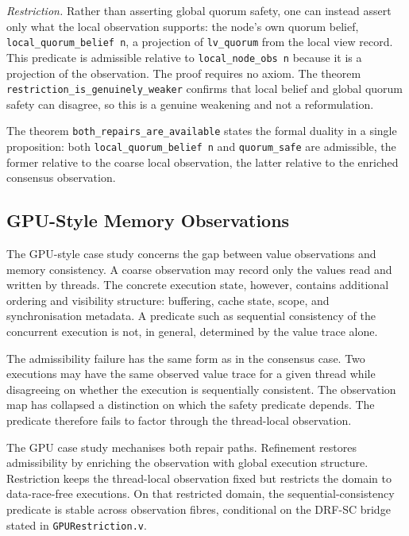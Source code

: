\textit{Restriction.} Rather than asserting global quorum safety, one can
instead assert only what the local observation supports: the node's own quorum
belief, \texttt{local\_quorum\_belief~n}, a projection of \texttt{lv\_quorum}
from the local view record. This predicate is admissible relative to
\texttt{local\_node\_obs~n} because it is a projection of the observation.
The proof requires no axiom. The theorem \texttt{restriction\_is\_genuinely\_weaker}
confirms that local belief and global quorum safety can disagree, so this is a
genuine weakening and not a reformulation.

The theorem \texttt{both\_repairs\_are\_available} states the formal duality
in a single proposition: both \texttt{local\_quorum\_belief~n} and
\texttt{quorum\_safe} are admissible, the former relative to the coarse local
observation, the latter relative to the enriched consensus observation.

\subsection{GPU-Style Memory Observations}

The GPU-style case study concerns the gap between value observations and memory
consistency. A coarse observation may record only the values read and written by
threads. The concrete execution state, however, contains additional ordering and
visibility structure: buffering, cache state, scope, and synchronisation
metadata. A predicate such as sequential consistency of the concurrent execution
is not, in general, determined by the value trace alone.

The admissibility failure has the same form as in the consensus case. Two
executions may have the same observed value trace for a given thread while
disagreeing on whether the execution is sequentially consistent. The observation
map has collapsed a distinction on which the safety predicate depends. The
predicate therefore fails to factor through the thread-local observation.

The GPU case study mechanises both repair paths. Refinement restores
admissibility by enriching the observation with global execution structure.
Restriction keeps the thread-local observation fixed but restricts the domain
to data-race-free executions. On that restricted domain, the
sequential-consistency predicate is stable across observation fibres,
conditional on the DRF-SC bridge stated in \texttt{GPURestriction.v}.

